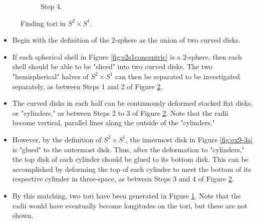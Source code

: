 \documentclass[titlepage]{article}
\numberwithin{figure}{section}
\numberwithin{table}{section}
\numberwithin{equation}{section}
\begin{document}
\begin{itemize}
\begin{figure}[h!]
\begin{subfigure}[b]{0.2\linewidth}
            \caption{Step 4.}
            \label{fig:ex9-3d}
        \end{subfigure}
        \caption{Finding tori in $S^2\times S^1$.}
        \label{fig:ex9-3}
    \end{figure}
    \begin{itemize}
        \item Begin with the definition of the 2-sphere as the union of two curved disks.
        \item If each spherical shell in Figure \ref{fig:s2s1concentric} is a 2-sphere, then each shell should be able to be "sliced" into two curved disks. The two "hemispherical" halves of $S^2\times S^1$ can then be separated to be investigated separately, as between Steps 1 and 2 of Figure \ref{fig:ex9-3}.
        \item The curved disks in each half can be continuously deformed stacked flat disks, or "cylinders," as between Steps 2 to 3 of Figure \ref{fig:ex9-3}. Note that the radii become vertical, parallel lines along the outside of the "cylinders."
        \item However, by the definition of $S^2\times S^1$, the innermost disk in Figure \ref{fig:ex9-3a} is "glued" to the outermost disk. Thus, after the deformation to "cylinders," the top disk of each cylinder should be glued to its bottom disk. This can be accomplished by deforming the top of each cylinder to meet the bottom of its respective cylinder in three-space, as between Steps 3 and 4 of Figure \ref{fig:ex9-3}.
        \item By this matching, two tori have been generated in Figure \ref{fig:ex9-3d}. Note that the radii would have eventually become longitudes on the tori, but these are not shown.

\end{itemize}
\end{itemize}
\end{document}
